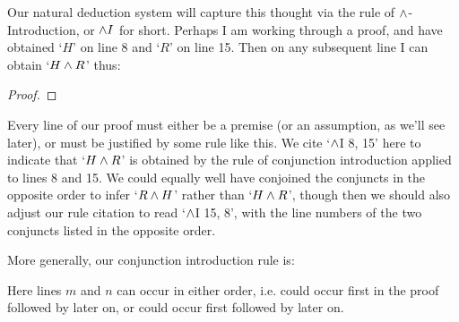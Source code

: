 Our natural deduction system will capture this thought via the rule of $\wedge$-Introduction, or $\wedge I$ for short. Perhaps I am working through a proof, and have obtained `$H$' on line 8 and `$R$' on line 15. Then on any subsequent line I can obtain `$H \wedge R$' thus:
\begin{proof}
	\have[\ ]{}{\vdots}
	\have[\ ]{}{\vdots}
	 
\end{proof}
Every line of our proof must either be a premise (or an assumption, as we'll see later), or must be justified by some rule like this. We cite `$\wedge$I 8, 15' here to indicate that `$H \wedge R$' is obtained by the rule of conjunction introduction applied to lines 8 and 15. We could equally well have conjoined the conjuncts in the opposite order to infer `$R \wedge H$' rather than `$H \wedge R$', though then we should also adjust our rule citation to read `$\wedge$I 15, 8', with the line numbers of the two conjuncts listed in the opposite order.

More generally, our conjunction introduction rule is:

Here lines $m$ and $n$ can occur in either order, i.e. \meta{\phi} could occur first in the proof followed by \meta{\psi} later on, or \meta{\psi} could occur first followed by \meta{\psi} later on.


